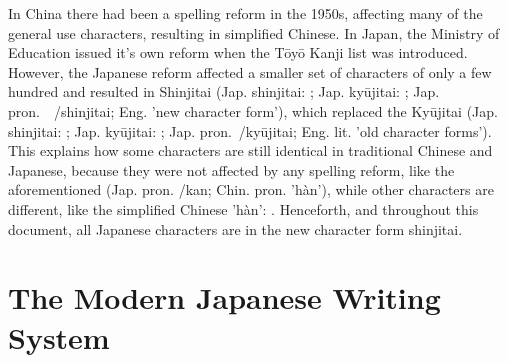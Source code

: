 In China there had been a spelling reform in the 1950s, affecting many of the
general use characters, resulting in simplified Chinese. In Japan, the Ministry
of Education issued it's own reform when the Tōyō Kanji list was introduced.
However, the Japanese reform affected a smaller set of characters of only a few 
hundred and resulted in Shinjitai (Jap. shinjitai: ; 
Jap. kyūjitai: ;
Jap. pron.　/shinjitai; Eng. 'new character form'), 
which replaced the Kyūjitai 
(Jap. shinjitai: ; Jap. kyūjitai: ; 
Jap. pron.~/kyūjitai; Eng. lit. 'old character forms'). 
This explains how some characters are still identical in traditional Chinese and 
Japanese, because they were not affected by any spelling reform, like the 
aforementioned  (Jap. pron. /kan; Chin. pron. 'hàn'),
while other characters are different, like the simplified 
Chinese 'hàn': . Henceforth, and throughout this document, all Japanese characters are in the new character form shinjitai.

\section{The Modern Japanese Writing System}
\label{sec:modernjapanesewritingsystem}


